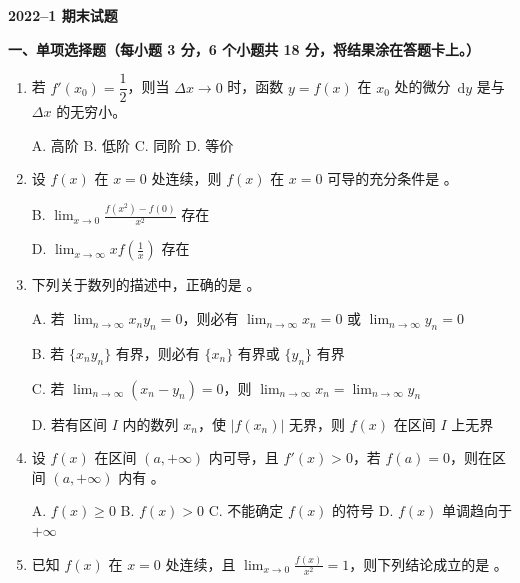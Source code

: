 \documentclass[a4paper,11pt]{ctexart}
\newcommand{\dd}{\,\mathrm{d}}
\newcommand{\choice}[1]{\text{【\quad】}}
\begin{document}
\begin{center}
  {\Large\bfseries 2022--1 期末试题}
\end{center}

\vspace{0.6em}

\textbf{一、单项选择题（每小题 3 分，6 个小题共 18 分，将结果涂在答题卡上。）}

\begin{enumerate}[label=\arabic*., leftmargin=2em, itemsep=0.65em, topsep=0.5em]
  \item 若 $f'(x_0)=\dfrac{1}{2}$，则当 $\Delta x\to 0$ 时，函数 $y=f(x)$ 在 $x_0$ 处的微分 $\dd y$ 是与 $\Delta x$ \choice{} 的无穷小。

  A. 高阶 \qquad\qquad\quad
  B. 低阶 \qquad\qquad\quad
  C. 同阶 \qquad\qquad\quad
  D. 等价

  \item 设 $f(x)$ 在 $x=0$ 处连续，则 $f(x)$ 在 $x=0$ 可导的充分条件是 \choice{}。

  B. $\displaystyle\lim_{x\to 0}\frac{f(x^2)-f(0)}{x^2}$ 存在

  \vspace{0.4em}
  D. $\displaystyle\lim_{x\to\infty}xf\left(\frac{1}{x}\right)$ 存在

  \item 下列关于数列的描述中，正确的是 \choice{}。

  A. 若 $\displaystyle\lim_{n\to\infty}x_n y_n=0$，则必有 $\displaystyle\lim_{n\to\infty}x_n=0$ 或 $\displaystyle\lim_{n\to\infty}y_n=0$

  B. 若 $\{x_n y_n\}$ 有界，则必有 $\{x_n\}$ 有界或 $\{y_n\}$ 有界

  C. 若 $\displaystyle\lim_{n\to\infty}(x_n-y_n)=0$，则 $\displaystyle\lim_{n\to\infty}x_n=\lim_{n\to\infty}y_n$

  D. 若有区间 $I$ 内的数列 $x_n$，使 $|f(x_n)|$ 无界，则 $f(x)$ 在区间 $I$ 上无界

  \item 设 $f(x)$ 在区间 $(a,+\infty)$ 内可导，且 $f'(x)>0$，若 $f(a)=0$，则在区间 $(a,+\infty)$ 内有 \choice{}。

  A. $f(x)\ge 0$ \qquad\quad
  B. $f(x)>0$ \qquad\quad
  C. 不能确定 $f(x)$ 的符号 \qquad\quad
  D. $f(x)$ 单调趋向于 $+\infty$

  \item 已知 $f(x)$ 在 $x=0$ 处连续，且 $\displaystyle\lim_{x\to 0}\frac{f(x)}{x^2}=1$，则下列结论成立的是 \choice{}。


\end{enumerate}
\end{document}
